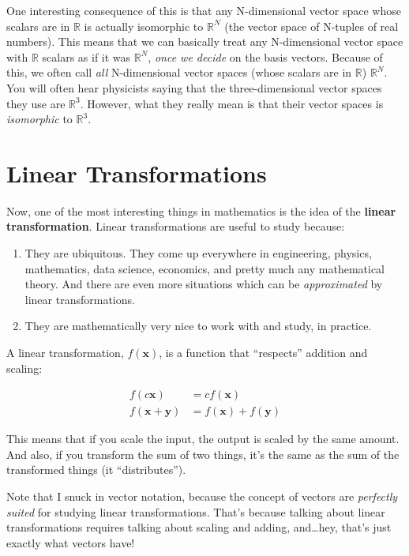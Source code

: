 \documentclass[]{article}
\begin{document}
One interesting consequence of this is that any N-dimensional vector space whose
scalars are in \(\mathbb{R}\) is actually isomorphic to \(\mathbb{R}^N\) (the
vector space of N-tuples of real numbers). This means that we can basically
treat any N-dimensional vector space with \(\mathbb{R}\) scalars as if it was
\(\mathbb{R}^N\), \emph{once we decide} on the basis vectors. Because of this,
we often call \emph{all} N-dimensional vector spaces (whose scalars are in
\(\mathbb{R}\)) \(\mathbb{R}^N\). You will often hear physicists saying that the
three-dimensional vector spaces they use are \(\mathbb{R}^3\). However, what
they really mean is that their vector spaces is \emph{isomorphic} to
\(\mathbb{R}^3\).

\section{Linear Transformations}\label{linear-transformations}

Now, one of the most interesting things in mathematics is the idea of the
\textbf{linear transformation}. Linear transformations are useful to study
because:

\begin{enumerate}
\def\labelenumi{\arabic{enumi}.}
\tightlist
\item
  They are ubiquitous. They come up everywhere in engineering, physics,
  mathematics, data science, economics, and pretty much any mathematical theory.
  And there are even more situations which can be \emph{approximated} by linear
  transformations.
\item
  They are mathematically very nice to work with and study, in practice.
\end{enumerate}

A linear transformation, \(f(\mathbf{x})\), is a function that ``respects''
addition and scaling:

\[
\begin{aligned}
f(c\mathbf{x}) & = c f(\mathbf{x}) \\
f(\mathbf{x} + \mathbf{y}) & = f(\mathbf{x}) + f(\mathbf{y})
\end{aligned}
\]

This means that if you scale the input, the output is scaled by the same amount.
And also, if you transform the sum of two things, it's the same as the sum of
the transformed things (it ``distributes'').

Note that I snuck in vector notation, because the concept of vectors are
\emph{perfectly suited} for studying linear transformations. That's because
talking about linear transformations requires talking about scaling and adding,
and\ldots hey, that's just exactly what vectors have!
\end{document}
